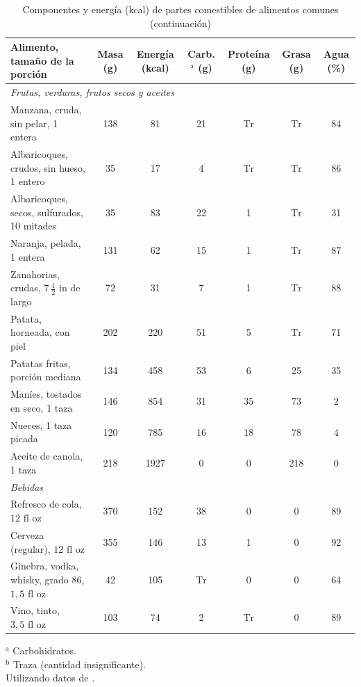 \documentclass[12pt]{book}
\begin{document}
\begin{table}[htbp]
\centering
\addtocounter{table}{-1}
\caption{Componentes y energía (kcal) de partes comestibles de alimentos comunes (continuación)}
\small
\begin{tabularx}{\textwidth}{Xcccccc}
\toprule
\textbf{Alimento, tamaño de la porción} & \textbf{Masa (g)} & \textbf{Energía (kcal)} & \textbf{Carb.$^{\text{a}}$ (g)} & \textbf{Proteína (g)} & \textbf{Grasa (g)} & \textbf{Agua (\%)} \\
\midrule
\multicolumn{7}{l}{\textit{Frutas, verduras, frutos secos y aceites}} \\
Manzana, cruda, sin pelar, 1 entera & 138 & 81 & 21 & $\text{Tr}$ & $\text{Tr}$ & 84 \\
Albaricoques, crudos, sin hueso, 1 entero & 35 & 17 & 4 & $\text{Tr}$ & $\text{Tr}$ & 86 \\
Albaricoques, secos, sulfurados, 10 mitades & 35 & 83 & 22 & 1 & $\text{Tr}$ & 31 \\
Naranja, pelada, 1 entera & 131 & 62 & 15 & 1 & $\text{Tr}$ & 87 \\
Zanahorias, crudas, $7\ \frac{1}{2}\text{ in}$ de largo & 72 & 31 & 7 & 1 & $\text{Tr}$ & 88 \\
Patata, horneada, con piel & 202 & 220 & 51 & 5 & $\text{Tr}$ & 71 \\
Patatas fritas, porción mediana & 134 & 458 & 53 & 6 & 25 & 35 \\
Maníes, tostados en seco, 1 taza & 146 & 854 & 31 & 35 & 73 & 2 \\
Nueces, 1 taza picada & 120 & 785 & 16 & 18 & 78 & 4 \\
Aceite de canola, 1 taza & 218 & 1927 & 0 & 0 & 218 & 0 \\
\midrule
\multicolumn{7}{l}{\textit{Bebidas}} \\
Refresco de cola, $12\text{ fl oz}$ & 370 & 152 & 38 & 0 & 0 & 89 \\
Cerveza (regular), $12\text{ fl oz}$ & 355 & 146 & 13 & 1 & 0 & 92 \\
Ginebra, vodka, whisky, grado 86, $1,5\text{ fl oz}$ & 42 & 105 & $\text{Tr}$ & 0 & 0 & 64 \\
Vino, tinto, $3,5\text{ fl oz}$ & 103 & 74 & 2 & $\text{Tr}$ & 0 & 89 \\
\bottomrule
\end{tabularx}
\begin{flushleft}
    $^{\text{a}}$ Carbohidratos.\\
    $^{\text{b}}$ Traza (cantidad insignificante).\\
    Utilizando datos de \cite{41}.
\end{flushleft}
\end{table}
\end{document}
